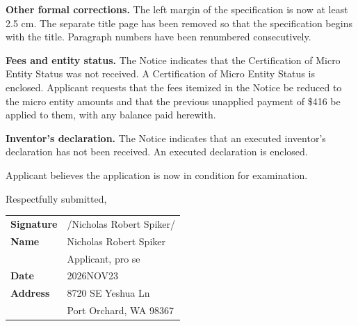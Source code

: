 \documentclass[12pt,letter]{article}
\begin{document}
\textbf{Other formal corrections.} The left margin of the specification is now at least 2.5 cm. The separate title page has been removed so that the specification begins with the title. Paragraph numbers have been renumbered consecutively.

\textbf{Fees and entity status.} The Notice indicates that the Certification of Micro Entity Status was not received. A Certification of Micro Entity Status is enclosed. Applicant requests that the fees itemized in the Notice be reduced to the micro entity amounts and that the previous unapplied payment of \$416 be applied to them, with any balance paid herewith.

\textbf{Inventor's declaration.} The Notice indicates that an executed inventor's declaration has not been received. An executed declaration is enclosed.

Applicant believes the application is now in condition for examination.

\vspace{1.5em}
Respectfully submitted,

\vspace{1.5em}
\begin{tabular}{@{}>{\bfseries}p{3.2cm}p{9cm}@{}}
Signature & /Nicholas Robert Spiker/ \\
Name & Nicholas Robert Spiker \\
 & Applicant, pro se \\
Date & 2026NOV23 \\
Address & 8720 SE Yeshua Ln \\
 & Port Orchard, WA 98367 \\
\end{tabular}

\label{lastpage}
\end{document}
